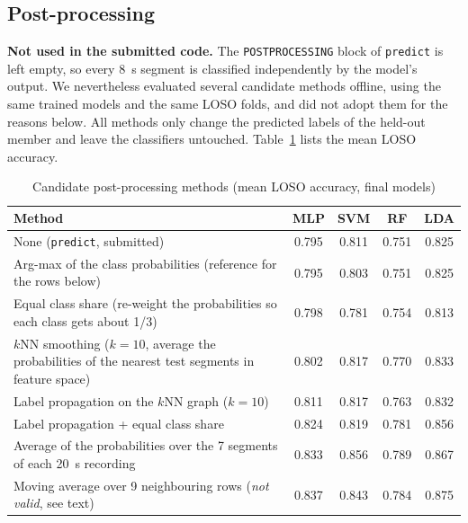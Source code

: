 \subsection{Post-processing}
\textbf{Not used in the submitted code.} The \texttt{POSTPROCESSING} block of \texttt{predict} is left empty, so every 8~s segment is classified independently by the model's output. We nevertheless evaluated several candidate methods offline, using the same trained models and the same LOSO folds, and did not adopt them for the reasons below. All methods only change the predicted labels of the held-out member and leave the classifiers untouched. Table~\ref{tab:postproc} lists the mean LOSO accuracy.

\begin{table}[!htb]
    \centering
    \caption{Candidate post-processing methods (mean LOSO accuracy, final models)}
    \label{tab:postproc}
    \begin{tabularx}{\textwidth}{@{} X c c c c @{}}
        \toprule
        \textbf{Method} & \textbf{MLP} & \textbf{SVM} & \textbf{RF} & \textbf{LDA} \\
        \midrule
        None (\texttt{predict}, submitted) & 0.795 & 0.811 & 0.751 & 0.825 \\
        Arg-max of the class probabilities (reference for the rows below) & 0.795 & 0.803 & 0.751 & 0.825 \\
        Equal class share (re-weight the probabilities so each class gets about 1/3) & 0.798 & 0.781 & 0.754 & 0.813 \\
        $k$NN smoothing ($k=10$, average the probabilities of the nearest test segments in feature space) & 0.802 & 0.817 & 0.770 & 0.833 \\
        Label propagation on the $k$NN graph ($k=10$) & 0.811 & 0.817 & 0.763 & 0.832 \\
        Label propagation + equal class share & 0.824 & 0.819 & 0.781 & 0.856 \\
        Average of the probabilities over the 7 segments of each 20~s recording & 0.833 & 0.856 & 0.789 & 0.867 \\
        Moving average over 9 neighbouring rows (\emph{not valid}, see text) & 0.837 & 0.843 & 0.784 & 0.875 \\
        \bottomrule
    \end{tabularx}
\end{table}

